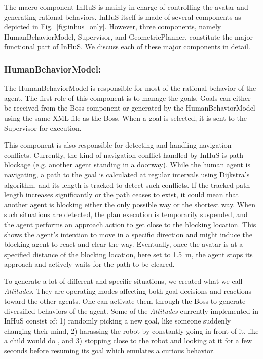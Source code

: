 The macro component InHuS is mainly in charge of controlling the avatar and generating rational behaviors. InHuS itself is made of several components as depicted in Fig.~\ref{fig:inhus_only}. However, three components, namely HumanBehaviorModel, Supervisor, and GeometricPlanner, constitute the major functional part of InHuS. We discuss each of these major components in detail.


\subsubsection{HumanBehaviorModel:}

The HumanBehaviorModel is responsible for most of the rational behavior of the agent. The first role of this component is to manage the goals. Goals can either be received from the Boss component or generated by the HumanBehaviorModel using the same XML file as the Boss. When a goal is selected, it is sent to the Supervisor for execution. 

This component is also responsible for detecting and handling navigation conflicts. Currently, the kind of navigation conflict handled by InHuS is path blockage (e.g. another agent standing in a doorway). While the human agent is navigating, a path to the goal is calculated at regular intervals using Dijkstra's algorithm, and its length is tracked to detect such conflicts. If the tracked path length increases significantly or the path ceases to exist, it could mean that another agent is blocking either the only possible way or the shortest way. When such situations are detected, the plan execution is temporarily suspended, and the agent performs an approach action to get close to the blocking location. This shows the agent's intention to move in a specific direction and might induce the blocking agent to react and clear the way.
Eventually, once the avatar is at a specified distance of the blocking location, here set to \SI{1.5}{\metre}, the agent stops its approach and actively waits for the path to be cleared.

To generate a lot of different and specific situations, we created what we call \textit{Attitudes}. They are operating modes affecting both goal decisions and reactions toward the other agents. One can activate them through the Boss to generate diversified behaviors of the agent. Some of the \textit{Attitudes} currently implemented in InHuS consist of: 1) randomly picking a new goal, like someone suddenly changing their mind, 2) harassing the robot by constantly going in front of it, like a child would do \cite{nomura2016children}, and 3) stopping close to the robot and looking at it for a few seconds before resuming its goal which emulates a curious behavior. 

